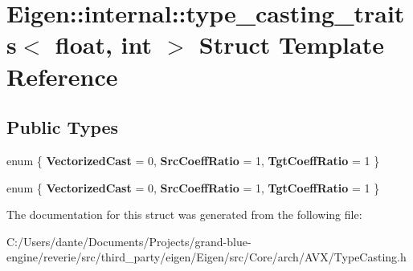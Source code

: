 \hypertarget{struct_eigen_1_1internal_1_1type__casting__traits_3_01float_00_01int_01_4}{}\section{Eigen\+::internal\+::type\+\_\+casting\+\_\+traits$<$ float, int $>$ Struct Template Reference}
\label{struct_eigen_1_1internal_1_1type__casting__traits_3_01float_00_01int_01_4}
\subsection*{Public Types}
\begin{DoxyCompactItemize}
\item 
\mbox{\label{struct_eigen_1_1internal_1_1type__casting__traits_3_01float_00_01int_01_4_aef1a8ba896f727a817d6c0e6fdaf3ea8}} 
enum \{ {\bfseries Vectorized\+Cast} = 0, 
{\bfseries Src\+Coeff\+Ratio} = 1, 
{\bfseries Tgt\+Coeff\+Ratio} = 1
 \}
\item 
\mbox{\label{struct_eigen_1_1internal_1_1type__casting__traits_3_01float_00_01int_01_4_aec93d24820bf672c09a310a671dd8022}} 
enum \{ {\bfseries Vectorized\+Cast} = 0, 
{\bfseries Src\+Coeff\+Ratio} = 1, 
{\bfseries Tgt\+Coeff\+Ratio} = 1
 \}
\end{DoxyCompactItemize}


The documentation for this struct was generated from the following file\+:\begin{DoxyCompactItemize}
\item 
C\+:/\+Users/dante/\+Documents/\+Projects/grand-\/blue-\/engine/reverie/src/third\+\_\+party/eigen/\+Eigen/src/\+Core/arch/\+A\+V\+X/Type\+Casting.\+h\end{DoxyCompactItemize}
